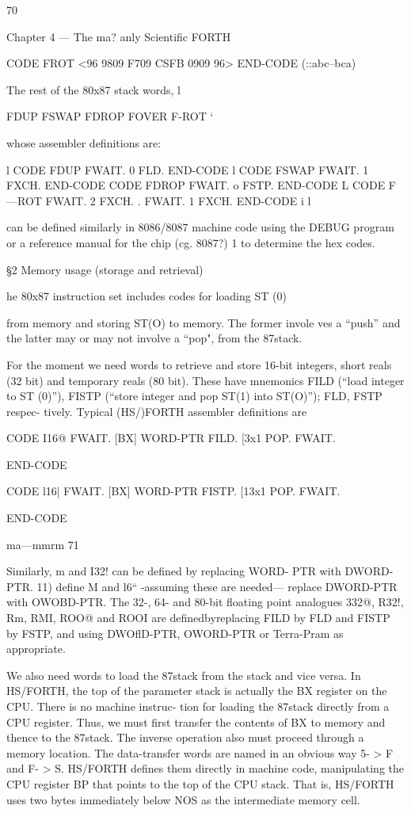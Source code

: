 70

Chapter 4 — The ma? anly Scientiﬁc FORTH

CODE FROT <96 9809 F709 CSFB 0909 96>
END-CODE (::abc--bca)

The rest of the 80x87 stack words, l

FDUP FSWAP FDROP FOVER F-ROT ‘

whose assembler deﬁnitions are:

l
CODE FDUP FWAIT. 0 FLD. END-CODE l
CODE FSWAP FWAIT. 1 FXCH. END-CODE
CODE FDROP FWAIT. o FSTP. END-CODE L
CODE F—ROT FWAIT. 2 FXCH. .
FWAIT. 1 FXCH. END-CODE i
l

 

can be deﬁned similarly in 8086/8087 machine code using the
DEBUG program or a reference manual for the chip (cg. 8087?) 1
to determine the hex codes.

§2 Memory usage (storage and retrieval)

he 80x87 instruction set includes codes for loading ST (0)

from memory and storing ST(O) to memory. The former invole
ves a “push” and the latter may or may not involve a “pop", from
the 87stack.

For the moment we need words to retrieve and store 16-bit
integers, short reals (32 bit) and temporary reals (80 bit).
These have mnemonics FILD (“load integer to ST (0)”), FISTP
(“store integer and pop ST(1) into ST(O)”); FLD, FSTP respec-
tively. Typical (HS/)FORTH assembler deﬁnitions are

CODE I16@
FWAIT. [BX] WORD-PTR FILD.
[3x1 POP.
FWAIT.

END-CODE

CODE l16|
FWAIT. [BX] WORD-PTR FISTP.
[13x1 POP.
FWAIT.

END-CODE

ma—mmrm 71

Similarly, m and I32! can be deﬁned by replacing WORD-
PTR with DWORD-PTR. 11) deﬁne M and l6“ -assuming
these are needed— replace DWORD-PTR with OWOBD-PTR.
The 32-, 64- and 80-bit ﬂoating point analogues 332@, R32!,
Rm, RMI, ROO@ and ROOI are deﬁnedbyreplacing FILD
by FLD and FISTP by FSTP, and using DWOﬂD-PTR,
OWORD-PTR or Terra-Pram as appropriate.

We also need words to load the 87stack from the stack and vice
versa. In HS/FORTH, the top of the parameter stack is
actually the BX register on the CPU. There is no machine instruc-
tion for loading the 87stack directly from a CPU register. Thus,
we must ﬁrst transfer the contents of BX to memory and thence
to the 87stack. The inverse operation also must proceed through
a memory location. The data-transfer words are named in an
obvious way 5- > F and F- > S. HS/FORTH deﬁnes them directly
in machine code, manipulating the CPU register BP that points
to the top of the CPU stack. That is, HS/FORTH uses two bytes
immediately below NOS as the intermediate memory cell.

